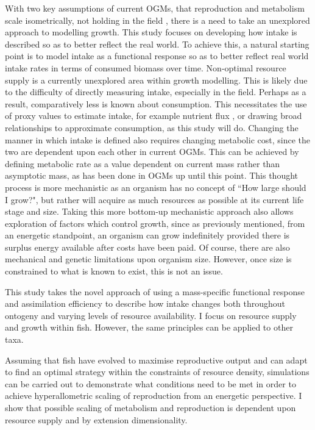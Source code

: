 \documentclass[a4paper, 11pt, hidelinks]{article} %
\begin{document}
	With two key assumptions of current OGMs, that reproduction and metabolism scale isometrically, not holding in the field \parencite{Barneche2018, Peters1983}, there is a need to take an unexplored approach to modelling growth.  This study focuses on developing how intake is described so as to better reflect the real world.  To achieve this, a natural starting point is to model intake as a functional response \parencite{Holling1959} so as to better reflect real world intake rates in terms of consumed biomass over time.  Non-optimal resource supply is a currently unexplored area within growth modelling.  This is likely due to the difficulty of directly measuring intake, especially in the field. Perhaps as a result, comparatively less is known about consumption.  This necessitates the use of proxy values to estimate intake, for example nutrient flux \parencite{Schiettekatte2020}, or drawing broad relationships to approximate consumption, as this study will do.
	Changing the manner in which intake is defined also requires changing metabolic cost, since the two are dependent upon each other in current OGMs.  This can be achieved by defining metabolic rate as a value dependent on current mass rather than asymptotic mass, as has been done in OGMs up until this point.  This thought process is more mechanistic as an organism has no concept of ``How large should I grow?", but rather will acquire as much resources as possible at its current life stage and size.  Taking this more bottom-up mechanistic approach also allows exploration of factors which control growth, since as previously mentioned, from an energetic standpoint, an organism can grow indefinitely provided there is surplus energy available after costs have been paid.  Of course, there are also mechanical and genetic limitations upon organism size. However, once size is constrained to what is known to exist, this is not an issue.  
	
	This study takes the novel approach of using a mass-specific functional response and assimilation efficiency to describe how intake changes both throughout ontogeny and varying levels of resource availability. I focus on resource supply and growth within fish. However, the same principles can be applied to other taxa.
	
	Assuming that fish have evolved to maximise reproductive output and can adapt to find an optimal strategy within the constraints of resource density, simulations can be carried out to demonstrate what conditions need to be met in order to achieve hyperallometric scaling of reproduction from an energetic perspective.  I show that possible scaling of metabolism and reproduction is dependent upon resource supply and by extension dimensionality.
\end{document}
